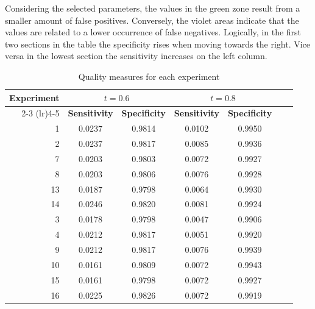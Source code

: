 Considering the selected parameters, the values in the green zone result from a smaller amount of false positives. Conversely, the violet areas indicate that the values are related to a lower occurrence of false negatives. 
Logically, in the first two sections in the table the specificity rises when moving towards the right. Vice versa in the lowest section the sensitivity increases on the left column.
\begin{table}
    \centering
    \caption{Quality measures for each experiment}    
    \begin{tabular}{rcccccc}
        \toprule
          \multirow{2}{*}{\textbf{Experiment}} & \multicolumn{2}{c}{$t=0.6$} & \multicolumn{2}{c}{$t=0.8$} \\
            \cmidrule(lr){2-3} \cmidrule(lr){4-5}
         & \textbf{Sensitivity} & \textbf{Specificity} & \textbf{Sensitivity} & \textbf{Specificity} \\
        \midrule
        1  & \cellcolor{green}0.0237  & \cellcolor{green}0.9814  & \cellcolor{green}0.0102 & \cellcolor{green}0.9950 \\  
        2  & \cellcolor{green}0.0237  & \cellcolor{green}0.9817  & \cellcolor{green}0.0085 & \cellcolor{green}0.9936 \\  
        7  & \cellcolor{green}0.0203  & \cellcolor{green}0.9803  & \cellcolor{green}0.0072 & \cellcolor{green}0.9927 \\  
        8  & \cellcolor{green}0.0203  & \cellcolor{green}0.9806  & \cellcolor{green}0.0076 & \cellcolor{green}0.9928 \\  
        13 & \cellcolor{green}0.0187  & \cellcolor{green}0.9798  & \cellcolor{green}0.0064 & \cellcolor{green}0.9930 \\  
        14 & \cellcolor{green}0.0246  & \cellcolor{green}0.9820  & \cellcolor{green}0.0081 & \cellcolor{green}0.9924 \\  [4pt] 
       

        3  & 0.0178  & 0.9798  & \cellcolor{green}0.0047 & \cellcolor{green}0.9906 \\  
        4  & 0.0212  & 0.9817  & \cellcolor{green}0.0051 & \cellcolor{green}0.9920 \\ 
        9  & 0.0212  & 0.9817  & \cellcolor{green}0.0076 & \cellcolor{green}0.9939 \\  
        10 & 0.0161  & 0.9809  & \cellcolor{green}0.0072 & \cellcolor{green}0.9943 \\  
        15 & 0.0161  & 0.9798  & \cellcolor{green}0.0072 & \cellcolor{green}0.9927 \\  
        16 & 0.0225  & 0.9826  & \cellcolor{green}0.0072 & \cellcolor{green}0.9919 \\ [4pt] 


\end{tabular}
\end{table}
